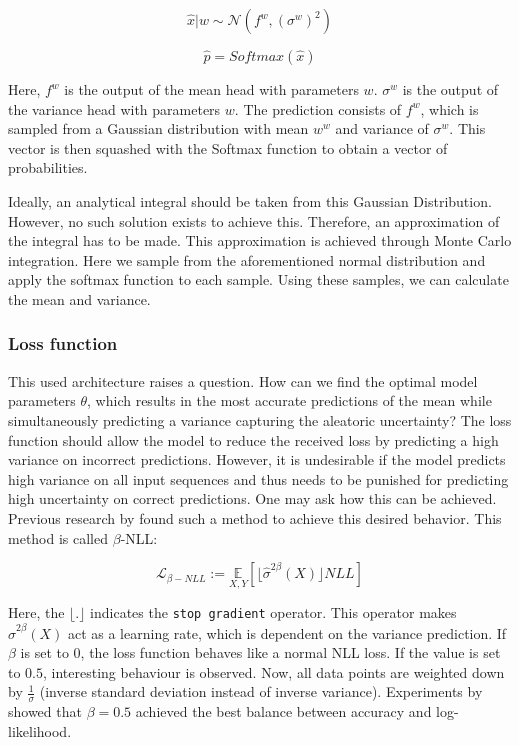 \begin{equation}
    \hat{x}|w \sim \mathcal{N}(f^w, (\sigma^w)^2)
\end{equation}

\begin{equation}
    \hat{p} = Softmax(\hat{x})
\end{equation}

Here, $f^w$ is the output of the mean head with parameters $w$. $\sigma^w$ is the output of the variance head with parameters $w$. The prediction consists of $f^w$, which is sampled from a Gaussian distribution with mean $w^w$ and variance of $\sigma^w$. This vector is then squashed with the Softmax function to obtain a vector of probabilities.

Ideally, an analytical integral should be taken from this Gaussian Distribution. However, no such solution exists to achieve this. Therefore, an approximation of the integral has to be made. This approximation is achieved through Monte Carlo integration. Here we sample from the aforementioned normal distribution and apply the softmax function to each sample. Using these samples, we can calculate the mean and variance.


\subsubsection{Loss function}

This used architecture raises a question. How can we find the optimal model parameters $\theta$, which results in the most accurate predictions of the mean while simultaneously predicting a variance capturing the aleatoric uncertainty? The loss function should allow the model to reduce the received loss by predicting a high variance on incorrect predictions. However, it is undesirable if the model predicts high variance on all input sequences and thus needs to be punished for predicting high uncertainty on correct predictions. One may ask how this can be achieved. Previous research by \cite{seitzer2022pitfalls} found such a method to achieve this desired behavior. This method is called $\beta$-NLL:

\begin{equation}
    \mathcal{L}_{\beta-NLL} := \underset{X, Y}{\mathbb{E}} \left[ \lfloor \hat{\sigma}^{2\beta}(X) \rfloor NLL \right]
\end{equation}

Here, the $\lfloor. \rfloor$ indicates the \verb|stop gradient| operator. This operator makes $\hat{\sigma}^{2\beta}(X)$ act as a learning rate, which is dependent on the variance prediction. If $\beta$ is set to 0, the loss function behaves like a normal NLL loss. If the value is set to $0.5$, interesting behaviour is observed. Now, all data points are weighted down by $\frac{1}{\sigma}$ (inverse standard deviation instead of inverse variance). Experiments by \cite{seitzer2022pitfalls} showed that $\beta = 0.5$ achieved the best balance between accuracy and log-likelihood.

